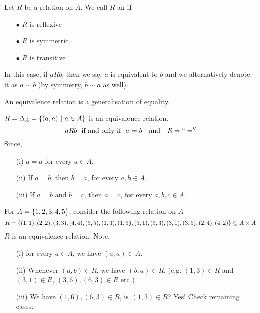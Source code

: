 \vspace*{1em}

\begin{definition}
Let $R$ be a relation on $A$. We call $R$ an  if
\begin{multicols}{3}
\begin{itemize}
\item[$\bullet$] $R$ is reflexive
\item[$\bullet$] $R$ is symmetric
\item[$\bullet$] $R$ is transitive
\end{itemize}
\end{multicols}
In this case, if $aRb$, then we say $a$ is equivalent to $b$ and we alternatively denote it as $a \sim b$ (by symmetry, $b \sim a$ as well).
\end{definition}

\vspace*{1em}

An equivalence relation is a generalisation of equality.
\begin{example}
$R = \Delta_A = \left\{(a,a)\ \vert\ a \in A\right\}$ is an equivalence relation.
\[aRb\ \text{ if and only if }\ a = b \quad \text{and} \quad R = ``=''\]
Since,
\begin{itemize}
\item[(i)] $a = a$ for every $a \in A$.
\item[(ii)] If $a = b$, then $b = a$, for every $a,b \in A$.
\item[(iii)] If $a = b$ and $b = c$, then $a = c$, for every $a,b,c \in A$.
\end{itemize}
\end{example}

\vspace*{1em}

\begin{example}\label{example:eqrel1}
For $A = \left\{1,2,3,4,5\right\}$, consider the following relation on $A$
\[R = \left\{(1,1),(2,2),(3,3),(4,4),(5,5),(1,3),(1,5),(5,1),(5,3),(3,1),(3,5),(2,4),(4,2)\right\} \subseteq A \times A\]
$R$ is an equivalence relation. Note,
\begin{itemize}
\item[(i)] for every $a \in A$, we have $(a,a) \in A$.
\item[(ii)] Whenever $(a,b) \in R$, we have $(b,a) \in R$. (e.g. $(1,3) \in R$ and $(3,1) \in R$, $(3,6),(6,3) \in R$ etc.)
\item[(iii)] We have $(1,6),(6,3) \in R$, is $(1,3) \in R$? Yes! Check remaining cases.
\end{itemize}
\end{example}

